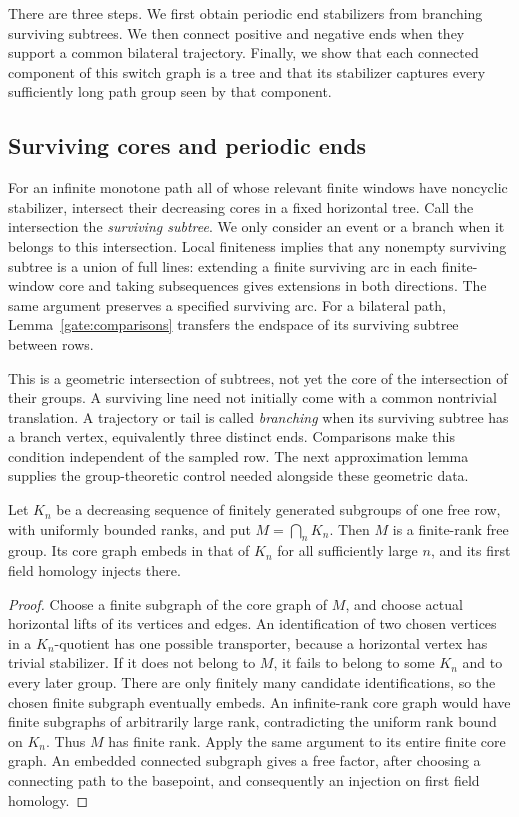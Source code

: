 There are three steps. We first obtain periodic end stabilizers from
branching surviving subtrees. We then connect positive and negative
ends when they support a common bilateral trajectory. Finally, we
show that each connected component of this switch graph is a tree
and that its stabilizer captures every sufficiently long path group
seen by that component.

\subsection{Surviving cores and periodic ends}

For an infinite monotone path all of whose relevant finite windows have
noncyclic stabilizer, intersect their decreasing cores in a fixed
horizontal tree.  Call the intersection the \emph{surviving subtree}.
We only consider an event or a branch when it belongs to this intersection.
Local finiteness implies that any nonempty surviving subtree is a union
of full lines: extending a finite surviving arc in each finite-window core
and taking subsequences gives extensions in both directions.  The same
argument preserves a specified surviving arc.  For a bilateral path,
Lemma~\ref{gate:comparisons} transfers the endspace of its surviving
subtree between rows.

This is a geometric intersection of subtrees, not yet the core of
the intersection of their groups. A surviving line need not initially
come with a common nontrivial translation. A trajectory or tail is
called \emph{branching} when its surviving subtree has a branch
vertex, equivalently three distinct ends. Comparisons make this
condition independent of the sampled row. The next approximation
lemma supplies the group-theoretic control needed alongside these
geometric data.

\begin{lemma}\label{gate:decreasing-cores}
Let \(K_n\) be a decreasing sequence of finitely generated subgroups
of one free row, with uniformly bounded ranks, and put
\(M=\bigcap_n K_n\). Then \(M\) is a finite-rank free group. Its
core graph embeds in that of \(K_n\) for all sufficiently large
\(n\), and its first field homology injects there.
\end{lemma}
\begin{proof}
Choose a finite subgraph of the core graph of \(M\), and choose
actual horizontal lifts of its vertices and edges. An identification
of two chosen vertices in a \(K_n\)-quotient has one possible
transporter, because a horizontal vertex has trivial stabilizer.
If it does not belong to \(M\), it fails to belong to some \(K_n\)
and to every later group. There are only finitely many candidate
identifications, so the chosen finite subgraph eventually embeds.
An infinite-rank core graph would have finite subgraphs of arbitrarily
large rank, contradicting the uniform rank bound on \(K_n\). Thus
\(M\) has finite rank. Apply the same argument to its entire finite
core graph. An embedded connected subgraph gives a free factor,
after choosing a connecting path to the basepoint, and consequently
an injection on first field homology.
\end{proof}

